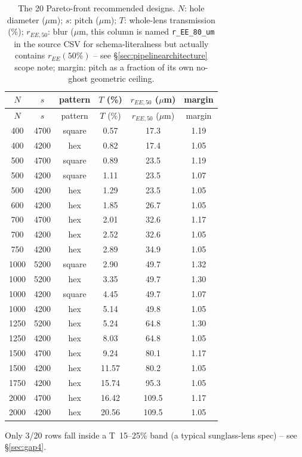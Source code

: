 \documentclass[11pt]{report}
\begin{document}
\begin{longtable}{cccccc}
\caption{The 20 Pareto-front recommended designs. $N$: hole diameter ($\mu$m); $s$: pitch
($\mu$m); $T$: whole-lens transmission (\%); $r_{EE,50}$: blur ($\mu$m, this column is named
\texttt{r\_EE\_80\_um} in the source CSV for schema-literalness but actually contains
$r_{EE}(50\%)$ -- see \S\ref{sec:pipelinearchitecture} scope note; margin: pitch as a
fraction of its own no-ghost geometric ceiling.}\label{tab:candidates}\\
\toprule
$N$ & $s$ & pattern & $T$ (\%) & $r_{EE,50}$ ($\mu$m) & margin \\
\midrule
\endfirsthead
\toprule
$N$ & $s$ & pattern & $T$ (\%) & $r_{EE,50}$ ($\mu$m) & margin \\
\midrule
\endhead
400 & 4700 & square & 0.57 & 17.3 & 1.19 \\
400 & 4200 & hex & 0.82 & 17.4 & 1.05 \\
500 & 4700 & square & 0.89 & 23.5 & 1.19 \\
500 & 4200 & square & 1.11 & 23.5 & 1.07 \\
500 & 4200 & hex & 1.29 & 23.5 & 1.05 \\
600 & 4200 & hex & 1.85 & 26.7 & 1.05 \\
700 & 4700 & hex & 2.01 & 32.6 & 1.17 \\
700 & 4200 & hex & 2.52 & 32.6 & 1.05 \\
750 & 4200 & hex & 2.89 & 34.9 & 1.05 \\
1000 & 5200 & square & 2.90 & 49.7 & 1.32 \\
1000 & 5200 & hex & 3.35 & 49.7 & 1.30 \\
1000 & 4200 & square & 4.45 & 49.7 & 1.07 \\
1000 & 4200 & hex & 5.14 & 49.8 & 1.05 \\
1250 & 5200 & hex & 5.24 & 64.8 & 1.30 \\
1250 & 4200 & hex & 8.03 & 64.8 & 1.05 \\
1500 & 4700 & hex & 9.24 & 80.1 & 1.17 \\
1500 & 4200 & hex & 11.57 & 80.2 & 1.05 \\
1750 & 4200 & hex & 15.74 & 95.3 & 1.05 \\
2000 & 4700 & hex & 16.42 & 109.5 & 1.17 \\
2000 & 4200 & hex & 20.56 & 109.5 & 1.05 \\
\bottomrule
\end{longtable}
Only 3/20 rows fall inside a T~15--25\% band (a typical sunglass-lens spec) -- see
\S\ref{sec:gap4}.
\end{document}
